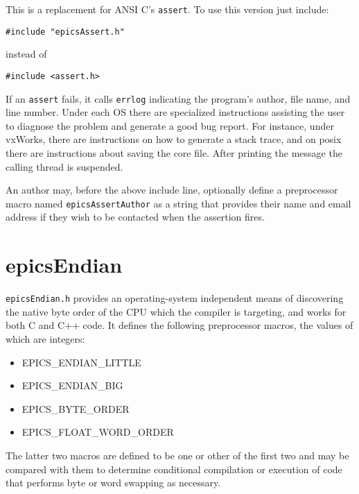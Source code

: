 This is a replacement for ANSI C's \verb|assert|. To use this version just include:

\begin{verbatim}
#include "epicsAssert.h"
\end{verbatim}

instead of

\begin{verbatim}
#include <assert.h>
\end{verbatim}

If an \verb|assert| fails, it calls \verb|errlog| indicating the program's author, file name, and line number. Under each OS there are 
specialized instructions assisting the user to diagnose the problem and generate a good bug report. For instance, under 
vxWorks, there are instructions on how to generate a stack trace, and on posix there are instructions about saving the core 
file. After printing the message the calling thread is suspended.

An author may, before the above include line, optionally define a preprocessor macro named \verb|epicsAssertAuthor| as 
a string that provides their name and email address if they wish to be contacted when the assertion fires.

\section{epicsEndian}

\verb|epicsEndian.h| provides an operating-system independent means of discovering the native byte order of the CPU 
which the compiler is targeting, and works for both C and C++ code. It defines the following preprocessor macros, the 
values of which are integers:

\begin{itemize}
\item EPICS\_ENDIAN\_LITTLE

\item EPICS\_ENDIAN\_BIG

\item EPICS\_BYTE\_ORDER

\item EPICS\_FLOAT\_WORD\_ORDER

\end{itemize}

The latter two macros are defined to be one or other of the first two and may be compared with them to determine 
conditional compilation or execution of code that performs byte or word swapping as necessary.

